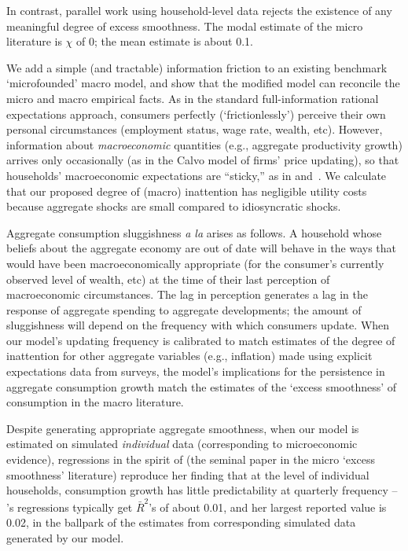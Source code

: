 \documentclass[titlepage]{./econtex}
\begin{document}
In contrast, parallel work using household-level data rejects the existence of any meaningful degree of excess smoothness.  The modal estimate of the micro literature is $\chi$ of 0; the mean estimate is about 0.1. 


We add a simple (and tractable) information friction to an existing benchmark `microfounded' macro model, and show that the modified model can reconcile the micro and macro empirical facts. As in the standard full-information rational expectations approach, consumers perfectly (`frictionlessly') perceive their own personal circumstances (employment status, wage rate, wealth, etc). However, information about \textit{macroeconomic} quantities (e.g., aggregate productivity growth) arrives only occasionally (as in the Calvo model of firms' price updating), so that households' macroeconomic expectations are ``sticky,'' as in \cite{mrSlumps} and~\cite{carroll:epidemicinflQJE}. We calculate that our proposed degree of (macro) inattention has negligible utility costs because aggregate shocks are small compared to idiosyncratic shocks.

Aggregate consumption sluggishness \textit{a la} \cite{cdSmooth} arises as follows.  A household whose beliefs about the aggregate economy are out of date will behave in the ways that would have been macroeconomically appropriate (for the consumer's currently observed level of wealth, etc) at the time of their last perception of macroeconomic circumstances.  The lag in perception generates a lag in the response of aggregate spending to aggregate developments; the amount of sluggishness will depend on the frequency with which consumers update.  When our model's updating frequency is calibrated to match estimates of the degree of inattention for other aggregate variables (e.g., inflation) made using explicit expectations data from surveys, the model's implications for the persistence in aggregate consumption growth match the estimates of the `excess smoothness' of consumption in the macro literature. 


Despite generating appropriate aggregate smoothness, when our model is estimated on simulated \emph{individual} data (corresponding to microeconomic evidence), regressions in the spirit of  \cite{dynanHabits} (the seminal paper in the micro `excess smoothness' literature) reproduce her finding that at the level of individual households, consumption growth has little predictability at quarterly frequency -- \cite{dynanHabits}'s regressions typically get $\bar{R}^{2}$'s of about 0.01, and her largest reported value is 0.02, in the ballpark of the estimates from corresponding simulated data generated by our model.
 
\end{document}
